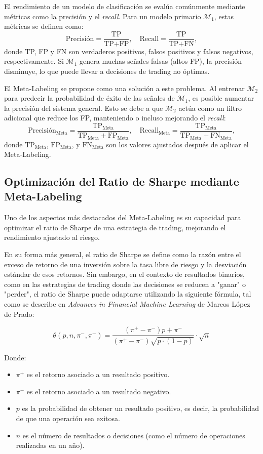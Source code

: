 \documentclass[a4paper,12pt, twoside]{report}
\begin{document}
El rendimiento de un modelo de clasificación se evalúa comúnmente mediante métricas 
como la precisión y el \textit{recall}. Para un modelo primario $\mathcal{M}_1$, 
estas métricas se definen como:
\[
\text{Precisión} = \frac{\text{TP}}{\text{TP} + \text{FP}}, \quad \text{Recall} = \frac{\text{TP}}{\text{TP} + \text{FN}},
\]
donde TP, FP y FN son verdaderos positivos, falsos positivos y falsos negativos, 
respectivamente. Si $\mathcal{M}_1$ genera muchas señales falsas (altos FP), 
la precisión disminuye, lo que puede llevar a decisiones de trading no óptimas.

El Meta-Labeling se propone como una solución a este problema. Al entrenar 
$\mathcal{M}_2$ para predecir la probabilidad de éxito de las señales de 
$\mathcal{M}_1$, es posible aumentar la precisión del sistema general. Esto 
se debe a que $\mathcal{M}_2$ actúa como un filtro adicional que reduce los 
FP, manteniendo o incluso mejorando el \textit{recall}:
\[
\text{Precisión}_{\text{Meta}} = \frac{\text{TP}_{\text{Meta}}}{\text{TP}_{\text{Meta}} + \text{FP}_{\text{Meta}}}, \quad \text{Recall}_{\text{Meta}} = \frac{\text{TP}_{\text{Meta}}}{\text{TP}_{\text{Meta}} + \text{FN}_{\text{Meta}}},
\]
donde $\text{TP}_{\text{Meta}}$, $\text{FP}_{\text{Meta}}$, y $\text{FN}_{\text{Meta}}$ 
son los valores ajustados después de aplicar el Meta-Labeling.


\subsection{Optimización del Ratio de Sharpe mediante Meta-Labeling}

Uno de los aspectos más destacados del Meta-Labeling es su capacidad para optimizar el 
ratio de Sharpe de una estrategia de trading, mejorando el rendimiento ajustado al riesgo. 


En su forma más general, el ratio de Sharpe se define como la razón entre el exceso 
de retorno de una inversión sobre la tasa libre de riesgo y la desviación estándar 
de esos retornos. Sin embargo, en el contexto de resultados binarios, como en las 
estrategias de trading donde las decisiones se reducen a "ganar" o "perder", el ratio 
de Sharpe puede adaptarse utilizando la siguiente fórmula, tal como se describe en 
\textit{Advances in Financial Machine Learning} 
de Marcos López de Prado:

\[
\theta(p, n, \pi^-, \pi^+) = \frac{(\pi^+ - \pi^-) p + \pi^-}{(\pi^+ - \pi^-) \sqrt{p \cdot (1 - p)}} \cdot \sqrt{n}
\]

Donde:
\begin{itemize}
    \item $\pi^+$ es el retorno asociado a un resultado positivo.
    \item $\pi^-$ es el retorno asociado a un resultado negativo.
    \item $p$ es la probabilidad de obtener un resultado positivo, es decir, la 
    probabilidad de que una operación sea exitosa.
    \item $n$ es el número de resultados o decisiones (como el número de 
    operaciones realizadas en un año).
\end{itemize}
\end{document}
